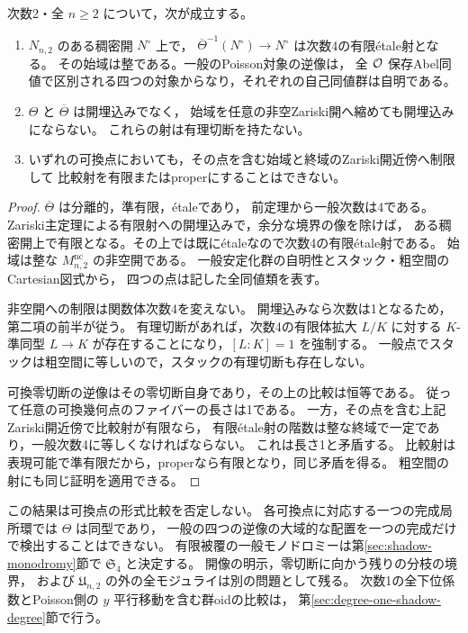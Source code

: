 \begin{corollary}[四つの一般逆像と大域的一意性の不存在]
\label{cor:degree-two-four-sheet-consequences}
次数2・全 $n\ge2$ について，次が成立する。
\begin{enumerate}
\item $N_{n,2}$ のある稠密開 $N^\circ$ 上で，
      $\overline\Theta^{-1}(N^\circ)\to N^\circ$ は次数4の有限\'{e}tale射となる。
      その始域は整である。一般のPoisson対象の逆像は，
      全 $\mathcal O$ 保存Abel同値で区別される四つの対象からなり，それぞれの自己同値群は自明である。
\item $\Theta$ と $\overline\Theta$ は開埋込みでなく，
      始域を任意の非空Zariski開へ縮めても開埋込みにならない。
      これらの射は有理切断を持たない。
\item いずれの可換点においても，その点を含む始域と終域のZariski開近傍へ制限して
      比較射を有限またはproperにすることはできない。
\end{enumerate}
\end{corollary}
\begin{proof}
$\overline\Theta$ は分離的，準有限，\'{e}taleであり，
前定理から一般次数は4である。
Zariski主定理による有限射への開埋込みで，余分な境界の像を除けば，
ある稠密開上で有限となる。その上では既に\'{e}taleなので次数4の有限\'{e}tale射である。
始域は整な $M^{\mathrm{nc}}_{n,2}$ の非空開である。
一般安定化群の自明性とスタック・粗空間のCartesian図式から，
四つの点は記した全同値類を表す。

非空開への制限は関数体次数4を変えない。
開埋込みなら次数は1となるため，第二項の前半が従う。
有理切断があれば，次数4の有限体拡大 $L/K$ に対する
$K$-準同型 $L\to K$ が存在することになり，$[L:K]=1$ を強制する。
一般点でスタックは粗空間に等しいので，スタックの有理切断も存在しない。

可換零切断の逆像はその零切断自身であり，その上の比較は恒等である。
従って任意の可換幾何点のファイバーの長さは1である。
一方，その点を含む上記Zariski開近傍で比較射が有限なら，
有限\'{e}tale射の階数は整な終域で一定であり，一般次数4に等しくなければならない。
これは長さ1と矛盾する。
比較射は表現可能で準有限だから，properなら有限となり，同じ矛盾を得る。
粗空間の射にも同じ証明を適用できる。
\end{proof}

この結果は可換点の形式比較を否定しない。
各可換点に対応する一つの完成局所環では $\Theta$ は同型であり，
一般の四つの逆像の大域的な配置を一つの完成だけで検出することはできない。
有限被覆の一般モノドロミーは第\ref{sec:shadow-monodromy}節で $\mathfrak S_4$ と決定する。
開像の明示，零切断に向かう残りの分枝の境界，
および $\mathfrak U_{n,2}$ の外の全モジュライは別の問題として残る。
次数1の全下位係数とPoisson側の $y$ 平行移動を含む群oidの比較は，
第\ref{sec:degree-one-shadow-degree}節で行う。
